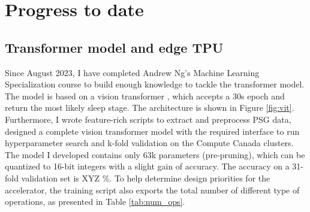 \documentclass[12pt]{article}
\begin{document}
    \begin{table}[ht]
        \centering
        \renewcommand{\arraystretch}{1.2} %
        \setlength{\arrayrulewidth}{1.5pt} %
        \caption{Design goals for AI model and ASIC accelerator}
        \label{tab:design_goals}
    \end{table}

    \section{Progress to date}

    \subsection{Transformer model and edge TPU}
    Since August 2023, I have completed Andrew Ng's Machine Learning Specialization course to build enough knowledge to tackle the transformer model. The model is based on a vision transformer \cite{dosovitskiy2010image}, which accepts a 
    30s epoch and return the most likely sleep stage. The architecture is shown in Figure \ref{fig:vit}.
    Furthermore, I wrote feature-rich scripts to extract and preprocess PSG data, designed a complete vision transformer model with the required interface to run hyperparameter search and k-fold validation on the Compute Canada clusters. The model I developed contains only 63k parameters (pre-pruning),
    which can be quantized to 16-bit integers with a slight gain of accuracy. The accuracy on a 31-fold validation set is XYZ \%. To help determine design priorities for the accelerator, the training script also exports the
    total number of different type of operations, as presented in Table \ref{tab:num_ops}.
\end{document}
